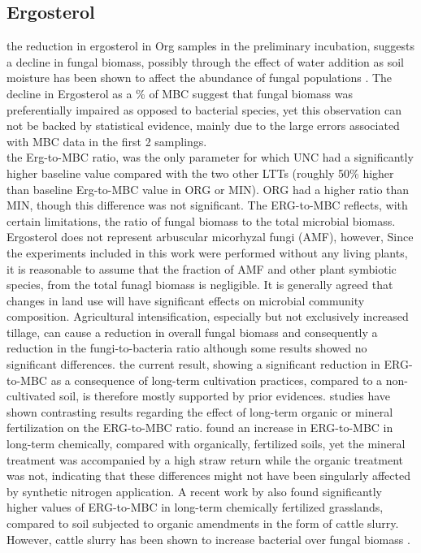 	\subsection{Ergosterol}
	the reduction in ergosterol in Org samples in the preliminary incubation, suggests a decline in fungal biomass, possibly through the effect of water addition as soil moisture has been shown to affect the abundance of fungal populations \citep{drenovsky2004, griffin1963}. The decline in Ergosterol as a \% of MBC suggest that fungal biomass was preferentially impaired as opposed to bacterial species, yet this observation can not be backed by statistical evidence, mainly due to the large errors associated with MBC data in the first 2 samplings.\\
	the Erg-to-MBC ratio, was the only parameter for which UNC had a significantly higher baseline value compared with the two other LTTs (roughly 50\% higher than baseline Erg-to-MBC value in ORG or MIN).
	ORG had a higher ratio than MIN, though this difference was not significant. The ERG-to-MBC reflects, with certain limitations, the ratio of fungal biomass to the total microbial biomass. Ergosterol does not represent arbuscular micorhyzal fungi (AMF), however, Since the experiments included in this work were performed without any living plants, it is reasonable to assume that the fraction of AMF and other plant symbiotic species, from the total funagl biomass is negligible.
	It is generally agreed that changes in land use will have significant effects on microbial community composition\myRed{*}. Agricultural intensification, especially but not exclusively increased tillage, can cause a reduction in overall fungal biomass and consequently a reduction in the fungi-to-bacteria ratio\myRed{*} although some results showed no significant differences\myRed{*}.
	the current result, showing a significant reduction in ERG-to-MBC as a consequence of long-term cultivation practices, compared to a non-cultivated soil, is therefore mostly supported by prior evidences.
	studies have shown contrasting results regarding the effect of long-term organic or mineral fertilization on the ERG-to-MBC ratio. \citet{heinze2010} found an increase in ERG-to-MBC in long-term chemically, compared with organically, fertilized soils, yet the mineral treatment was accompanied by a high straw return while the organic treatment was not, indicating that these differences might not have been  singularly affected by synthetic nitrogen application. A recent work by \citet{knoblauch2017} also found significantly higher values of ERG-to-MBC in long-term chemically fertilized grasslands, compared to soil subjected to organic amendments in the form of cattle slurry. However, cattle slurry has been shown to increase bacterial over fungal biomass \citet{knoblauch2017}.
